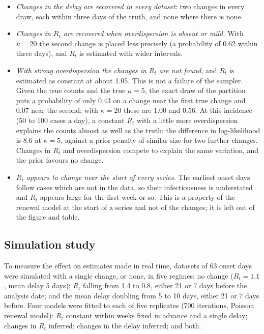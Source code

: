 \documentclass[11pt,a4paper]{article}
\begin{document}
\begin{itemize}[itemsep=2pt]
\item \emph{Changes in the delay are recovered in every dataset}: two changes
in every draw, each within three days of the truth, and none where there is
none.
\item \emph{Changes in $R_t$ are recovered when overdispersion is absent or
mild.} With $\kappa=20$ the second change is placed less precisely (a
probability of 0.62 within three days), and $R_t$ is estimated with wider
intervals.
\item \emph{With strong overdispersion the changes in $R_t$ are not found}, and
$R_t$ is estimated as constant at about 1.05. This is not a failure of the
sampler. Given the true counts and the true $\kappa=5$, the exact draw of the
partition puts a probability of only 0.43 on a change near the first true
change and 0.07 near the second; with $\kappa=20$ these are 1.00 and 0.56. At
this incidence (50 to 100 cases a day), a constant $R_t$ with a little more
overdispersion explains the counts almost as well as the truth: the difference
in log-likelihood is 8.6 at $\kappa=5$, against a prior penalty of similar
size for two further changes. Changes in $R_t$ and overdispersion compete to
explain the same variation, and the prior favours no change.
\item \emph{$R_t$ appears to change near the start of every series.} The
earliest onset days follow cases which are not in the data, so their
infectiousness is understated and $R_t$ appears large for the first week or
so. This is a property of the renewal model at the start of a series and not
of the changes; it is left out of the figure and table.
\end{itemize}

\subsection{Simulation study}\label{sec:changepointsimulation}

To measure the effect on estimates made in real time, datasets of 63 onset
days were simulated with a single change, or none, in five regimes: no change
($R_t=1.1$, mean delay 5 days); $R_t$ falling from 1.4 to 0.8, either 21 or 7
days before the analysis date; and the mean delay doubling from 5 to 10 days,
either 21 or 7 days before. Four models were fitted to each of five replicates
(700 iterations, Poisson renewal model): $R_t$ constant within weeks fixed in
advance and a single delay; changes in $R_t$ inferred; changes in the delay
inferred; and both.
\end{document}
